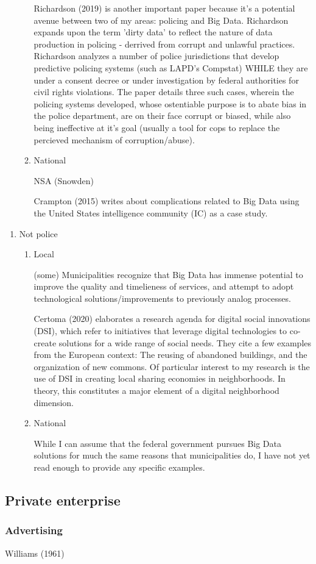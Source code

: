 \begin{enumerate}
\begin{enumerate}
Richardson (2019) is another important paper because it's a potential
avenue between two of my areas: policing and Big Data. Richardson
expands upon the term 'dirty data' to reflect the nature of data
production in policing - derrived from corrupt and unlawful
practices. Richardson analyzes a number of police jurisdictions that
develop predictive policing systems (such as LAPD's Compstat) WHILE
they are under a consent decree or under investigation by federal
authorities for civil rights violations. The paper details three such
cases, wherein the policing systems developed, whose ostentiable
purpose is to abate bias in the police department, are on their face
corrupt or biased, while also being ineffective at it's goal (usually
a tool for cops to replace the percieved mechanism of
corruption/abuse).

\item National

NSA (Snowden)

Crampton (2015) writes about complications related to Big Data using
the United States intelligence community (IC) as a case study.
  

\end{enumerate}
\end{enumerate}

\begin{enumerate}
\item Not police
  
\begin{enumerate}
\item Local

(some) Municipalities recognize that Big Data has immense potential to
  improve the quality and timelieness of services, and attempt to
  adopt technological solutions/improvements to previously analog
  processes.

Certoma (2020) elaborates a research agenda for digital social
innovations (DSI), which refer to initiatives that leverage digital
technologies to co-create solutions for a wide range of social
needs. They cite a few examples from the European context: The reusing
of abandoned buildings, and the organization of new commons. Of
particular interest to my research is the use of DSI in creating local
sharing economies in neighborhoods. In theory, this constitutes a
major element of a digital neighborhood dimension.

\item National

While I can assume that the federal government pursues Big Data
solutions for much the same reasons that municipalities do, I have not
yet read enough to provide any specific examples.
  
\end{enumerate}
\end{enumerate}

\subsection{Private enterprise}
\subsubsection{Advertising}

Williams (1961)
